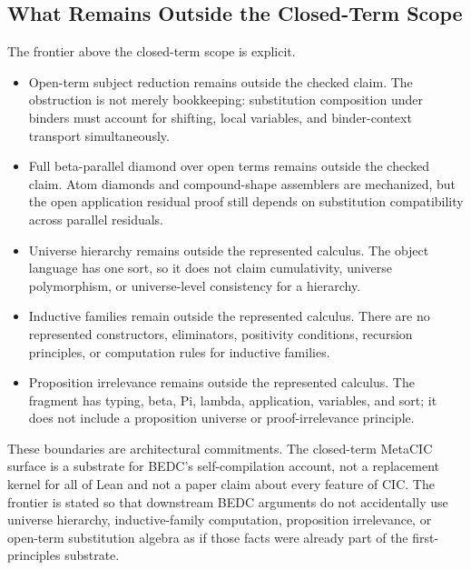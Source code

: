 \subsection{What Remains Outside the Closed-Term Scope}
\label{subsec:closed-term-open-frontier}

The frontier above the closed-term scope is explicit.

\begin{itemize}
  \item Open-term subject reduction remains outside the checked claim.  The
  obstruction is not merely bookkeeping: substitution composition under
  binders must account for shifting, local variables, and binder-context
  transport simultaneously.

  \item Full beta-parallel diamond over open terms remains outside the checked
  claim.  Atom diamonds and compound-shape assemblers are mechanized, but the
  open application residual proof still depends on substitution compatibility
  across parallel residuals.

  \item Universe hierarchy remains outside the represented calculus.  The
  object language has one sort, so it does not claim cumulativity, universe
  polymorphism, or universe-level consistency for a hierarchy.

  \item Inductive families remain outside the represented calculus.  There
  are no represented constructors, eliminators, positivity conditions,
  recursion principles, or computation rules for inductive families.

  \item Proposition irrelevance remains outside the represented calculus.  The
  fragment has typing, beta, Pi, lambda, application, variables, and sort; it
  does not include a proposition universe or proof-irrelevance principle.
\end{itemize}

These boundaries are architectural commitments.  The closed-term MetaCIC
surface is a substrate for BEDC's self-compilation account, not a replacement
kernel for all of Lean and not a paper claim about every feature of CIC.  The
frontier is stated so that downstream BEDC arguments do not accidentally use
universe hierarchy, inductive-family computation, proposition irrelevance, or
open-term substitution algebra as if those facts were already part of the
first-principles substrate.

